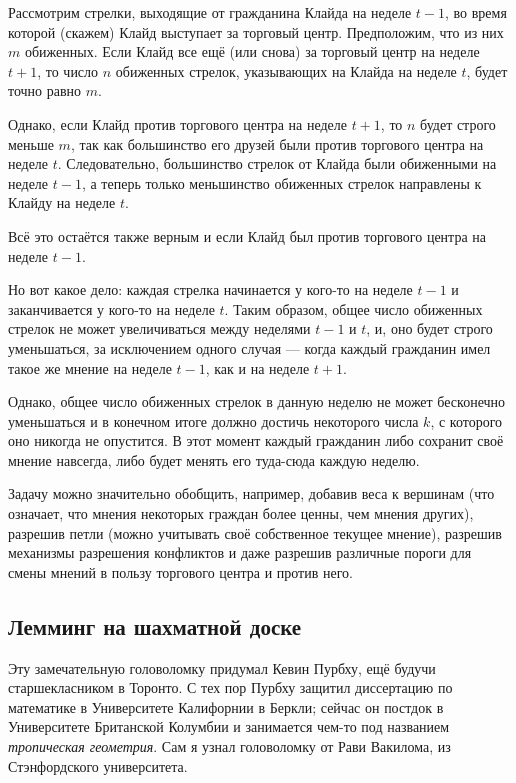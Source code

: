 Рассмотрим стрелки, выходящие от гражданина Клайда на неделе $t - 1$, во время которой (скажем) Клайд выступает за торговый центр.
Предположим, что из них $m$ обиженных.
Если Клайд все ещё (или снова) за торговый центр на неделе $t + 1$, то число $n$ обиженных стрелок, указывающих на Клайда на неделе $t$, будет точно равно $m$.

Однако, если Клайд против торгового центра на неделе $t + 1$, то $n$ будет строго меньше $m$, так как большинство его друзей были против торгового центра на неделе $t$.
Следовательно, большинство стрелок от Клайда были обиженными на неделе $t - 1$, а теперь только меньшинство обиженных стрелок направлены к Клайду на неделе $t$.

Всё это остаётся также верным и если Клайд был против торгового центра на неделе $t - 1$.

Но вот какое дело: каждая стрелка начинается у кого-то на неделе $t - 1$ и заканчивается у кого-то на неделе $t$. Таким образом, общее число обиженных стрелок не может увеличиваться между неделями $t - 1$ и $t$, и, оно будет строго уменьшаться, за исключением одного случая --- когда каждый гражданин имел такое же мнение на неделе $t - 1$, как и на неделе $t + 1$.

Однако, общее число обиженных стрелок в данную неделю не может бесконечно уменьшаться и в конечном итоге должно достичь некоторого числа $k$, с которого оно никогда не опустится.
В этот момент каждый гражданин либо сохранит своё мнение навсегда, либо будет менять его туда-сюда каждую неделю.

Задачу можно значительно обобщить, например, добавив веса к вершинам (что означает, что мнения некоторых граждан более ценны, чем мнения других), разрешив петли (можно учитывать своё собственное текущее мнение), разрешив механизмы разрешения конфликтов и даже разрешив различные пороги для смены мнений в пользу торгового центра и против него.

\subsection*{Лемминг на шахматной доске}

Эту замечательную головоломку придумал Кевин Пурбху, ещё будучи старшекласником в Торонто.
С тех пор Пурбху защитил диссертацию по математике в Университете Калифорнии в Беркли;
сейчас он постдок в Университете Британской Колумбии
и занимается чем-то под названием \emph{тропическая геометрия}.
Сам я узнал головоломку от Рави Вакилома, из Стэнфордского университета.


